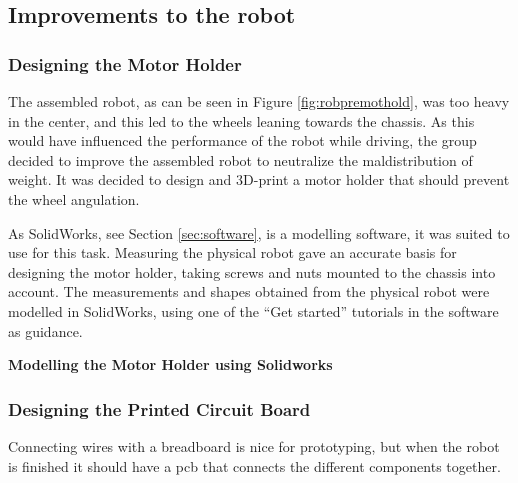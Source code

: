 \subsection{Improvements to the robot}
\label{sec:improvements}

\subsubsection{Designing the Motor Holder}
The assembled robot, as can be seen in Figure \ref{fig:robpremothold}, was too heavy in the center, and this led to the wheels leaning towards the chassis. As this would have influenced the performance of the robot while driving, the group decided to improve the assembled robot to neutralize the maldistribution of weight. It was decided to design and 3D-print a motor holder that should prevent the wheel angulation.

As SolidWorks, see Section \ref{sec:software}, is a modelling software, it was suited to use for this task. Measuring the physical robot gave an accurate basis for designing the motor holder, taking screws and nuts mounted to the chassis into account. The measurements and shapes obtained from the physical robot were modelled in SolidWorks, using one of the ``Get started'' tutorials in the software as guidance.

\textbf{Modelling the Motor Holder using Solidworks}



\subsubsection{Designing the Printed Circuit Board}
Connecting wires with a breadboard is nice for prototyping, but when the robot is finished it should have a \acrshort{pcb} that connects the different components together. 